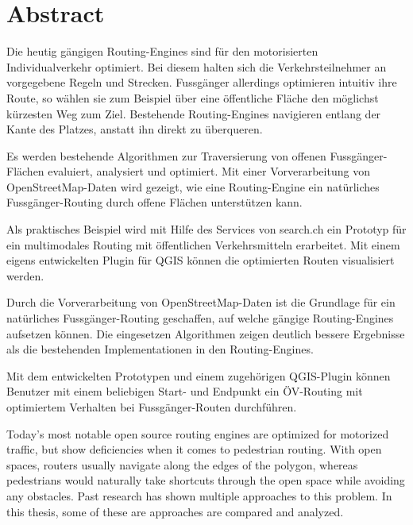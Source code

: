 
\chapter*{Abstract}

Die heutig gängigen Routing-Engines sind für den motorisierten Individualverkehr optimiert. Bei diesem halten sich die Verkehrsteilnehmer an vorgegebene Regeln und Strecken. Fussgänger allerdings optimieren intuitiv ihre Route, so wählen sie zum Beispiel über eine öffentliche Fläche den möglichst kürzesten Weg zum Ziel. Bestehende Routing-Engines navigieren entlang der Kante des Platzes, anstatt ihn direkt zu überqueren.

Es werden bestehende Algorithmen zur Traversierung von offenen Fussgänger-Flächen evaluiert, analysiert und optimiert. Mit einer Vorverarbeitung von OpenStreetMap-Daten wird gezeigt, wie eine Routing-Engine ein natürliches Fussgänger-Routing durch offene Flächen unterstützen kann.

Als praktisches Beispiel wird mit Hilfe des Services von search.ch ein Prototyp für ein multimodales Routing mit öffentlichen Verkehrsmitteln erarbeitet. Mit einem eigens entwickelten Plugin für QGIS können die optimierten Routen visualisiert werden.

Durch die Vorverarbeitung von OpenStreetMap-Daten ist die Grundlage für ein natürliches Fussgänger-Routing geschaffen, auf welche gängige Routing-Engines aufsetzen können. Die eingesetzen Algorithmen zeigen deutlich bessere Ergebnisse als die bestehenden Implementationen in den Routing-Engines.

Mit dem entwickelten Prototypen und einem zugehörigen QGIS-Plugin können Benutzer mit einem beliebigen Start- und Endpunkt ein ÖV-Routing mit optimiertem Verhalten bei Fussgänger-Routen durchführen.

\cleardoublepage

Today's most notable open source routing engines are optimized for motorized traffic, but show deficiencies when it comes to pedestrian routing. With open spaces, routers usually navigate along the edges of the polygon, whereas pedestrians would naturally take shortcuts through the open space while avoiding any obstacles.
Past research has shown multiple approaches to this problem. In this thesis, some of these are approaches are compared and analyzed.

